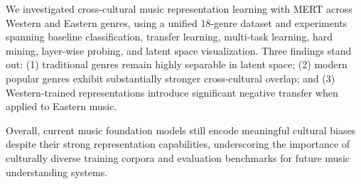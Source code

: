 \documentclass{article}
\begin{document}
We investigated cross-cultural music representation learning with MERT across Western and Eastern genres, using a unified 18-genre dataset and experiments spanning baseline classification, transfer learning, multi-task learning, hard mining, layer-wise probing, and latent space visualization. Three findings stand out: (1) traditional genres remain highly separable in latent space; (2) modern popular genres exhibit substantially stronger cross-cultural overlap; and (3) Western-trained representations introduce significant negative transfer when applied to Eastern music.

Overall, current music foundation models still encode meaningful cultural biases despite their strong representation capabilities, underscoring the importance of culturally diverse training corpora and evaluation benchmarks for future music understanding systems.



\end{document}
